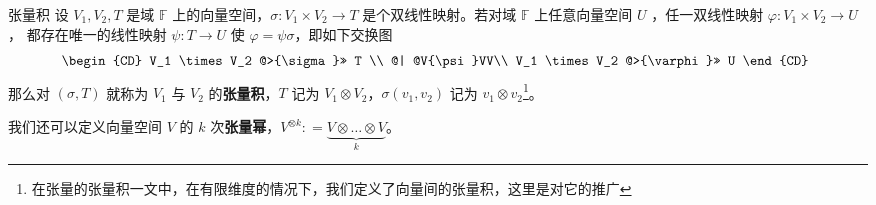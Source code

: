 
\begin{issues}
\issueDraft
\end{issues}



\begin{definition}{张量积}\label{def_vecTsr_1}
设 $V_1, V_2,T$ 是域 $\mathbb F$ 上的向量空间，$\sigma: V_1 \times V_2 \rightarrow T$ 是个双线性映射。若对域 $\mathbb F$ 上任意向量空间 $U$ ，任一双线性映射 $\varphi:V_1\times V_2\rightarrow U$， 都存在唯一的线性映射 $\psi:T\rightarrow U$ 使 $\varphi=\psi\sigma$，即如下交换图
\begin{equation}
\begin{CD}
V_1 \times V_2 @>{\sigma}>> T \\
@| @V{\psi}VV\\
V_1 \times V_2 @>{\varphi}>> U
\end{CD}~
\end{equation}
那么对 $(\sigma, T)$ 就称为 $V_1$ 与 $V_2$ 的\textbf{张量积}，$T$ 记为 $V_1 \otimes V_2$，$\sigma(v_1, v_2)$ 记为 $v_1 \otimes v_2$\footnote{在张量的张量积一文中，在有限维度的情况下，我们定义了向量间的张量积，这里是对它的推广}。

我们还可以定义向量空间 $V$ 的 $k$ 次\textbf{张量幂}，$V^{\otimes k}: = \underbrace{V \otimes \dots \otimes V}_k$。
\end{definition}
